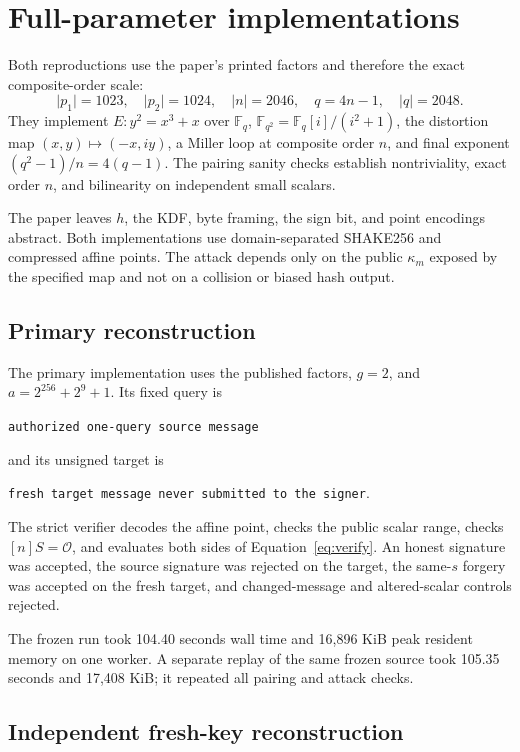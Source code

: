\documentclass[10pt,a4paper]{article}
\newcommand{\Opoint}{\mathcal{O}}
\begin{document}
\section{Full-parameter implementations}

Both reproductions use the paper's printed factors and therefore the exact
composite-order scale:
\[
 \lvert p_1\rvert=1023,\quad
 \lvert p_2\rvert=1024,\quad
 \lvert n\rvert=2046,\quad
 q=4n-1,\quad \lvert q\rvert=2048.
\]
They implement $E:y^2=x^3+x$ over $\mathbb{F}_q$,
$\mathbb{F}_{q^2}=\mathbb{F}_q[i]/(i^2+1)$, the distortion map
$(x,y)\mapsto(-x,iy)$, a Miller loop at composite order $n$, and final
exponent $(q^2-1)/n=4(q-1)$.  The pairing sanity checks establish
nontriviality, exact order $n$, and bilinearity on independent small scalars.

The paper leaves $h$, the KDF, byte framing, the sign bit, and point encodings
abstract.  Both implementations use domain-separated SHAKE256 and compressed
affine points.  The attack depends only on the public $\kappa_m$ exposed by
the specified map and not on a collision or biased hash output.

\subsection{Primary reconstruction}

The primary implementation uses the published factors, $g=2$, and
$a=2^{256}+2^9+1$.  Its fixed query is
\begin{center}
\texttt{authorized one-query source message}
\end{center}
and its unsigned target is
\begin{center}
\texttt{fresh target message never submitted to the signer}.
\end{center}
The strict verifier decodes the affine point, checks the public scalar range,
checks $[n]S=\Opoint$, and evaluates both sides of
Equation~\eqref{eq:verify}.  An honest signature was accepted, the source
signature was rejected on the target, the same-$s$ forgery was accepted on
the fresh target, and changed-message and altered-scalar controls rejected.

The frozen run took 104.40 seconds wall time and 16,896 KiB peak resident
memory on one worker.  A separate replay of the same frozen source took
105.35 seconds and 17,408 KiB; it repeated all pairing and attack checks.

\subsection{Independent fresh-key reconstruction}
\end{document}
